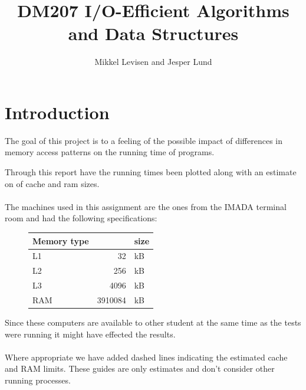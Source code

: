 \documentclass{article}
\newcommand{\subtitle}[1]{%
  \posttitle{%
    \par\end{center}
    \begin{center}\large#1\end{center}
    \vskip0.5em}%
}
\begin{document}
\title{DM207 I/O-Efficient Algorithms and Data Structures}
\subtitle{Fall 2015\\Project 1}
\author{Mikkel Levisen and Jesper Lund}
\maketitle
\thispagestyle{empty}
\newpage
\thispagestyle{empty}
\newpage
\section*{Introduction}
The goal of this project is to a feeling of the possible impact of differences 
in memory access patterns on the running time of programs. 

Through this report have the running times been plotted along with an estimate
on of cache and ram sizes.
\\
\\
The machines used in this assignment are the ones from the IMADA terminal room 
and had the following specifications:
\begin{figure}[H]
\centering
\begin{tabular}{lrl}
  Memory type & &size\\ 
  \hline
  L1 	&  	32&kB\\
  L2 	& 	256&kB\\
  L3 	& 	4096&kB\\
  RAM 	& 	3910084& kB
\end{tabular}
\end{figure}
\noindent Since these computers are available to other student at the same time as the 
tests were running it might have effected the results.
\\
\\
Where appropriate we have added dashed lines indicating the estimated cache and 
RAM limits. These guides are only estimates and don't consider other running 
processes. 
\end{document}
